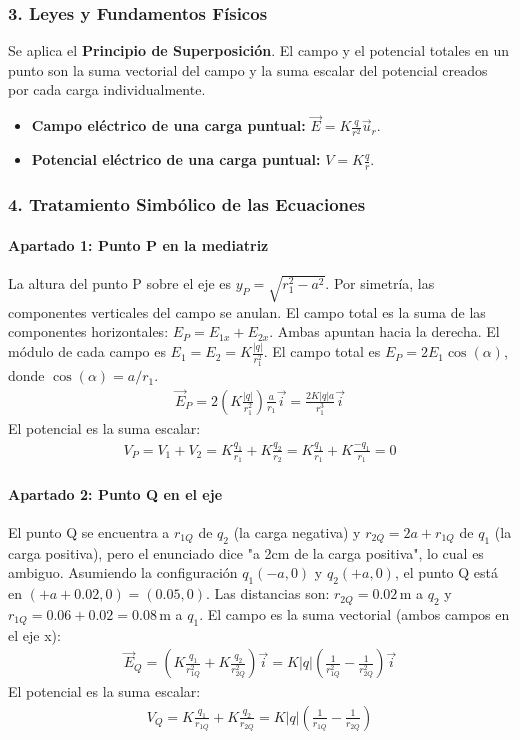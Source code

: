 \subsubsection*{3. Leyes y Fundamentos Físicos}
Se aplica el \textbf{Principio de Superposición}. El campo y el potencial totales en un punto son la suma vectorial del campo y la suma escalar del potencial creados por cada carga individualmente.
\begin{itemize}
    \item \textbf{Campo eléctrico de una carga puntual:} $\vec{E} = K \frac{q}{r^2} \vec{u}_r$.
    \item \textbf{Potencial eléctrico de una carga puntual:} $V = K \frac{q}{r}$.
\end{itemize}

\subsubsection*{4. Tratamiento Simbólico de las Ecuaciones}
\paragraph{Apartado 1: Punto P en la mediatriz}
La altura del punto P sobre el eje es $y_P = \sqrt{r_1^2 - a^2}$. Por simetría, las componentes verticales del campo se anulan. El campo total es la suma de las componentes horizontales: $E_P = E_{1x} + E_{2x}$. Ambas apuntan hacia la derecha. El módulo de cada campo es $E_1 = E_2 = K \frac{|q|}{r_1^2}$. El campo total es $E_P = 2 E_1 \cos(\alpha)$, donde $\cos(\alpha) = a/r_1$.
\begin{gather}
    \vec{E}_P = 2 \left(K \frac{|q|}{r_1^2}\right) \frac{a}{r_1} \vec{i} = \frac{2K|q|a}{r_1^3} \vec{i}
\end{gather}
El potencial es la suma escalar:
\begin{gather}
    V_P = V_1 + V_2 = K\frac{q_1}{r_1} + K\frac{q_2}{r_2} = K\frac{q_1}{r_1} + K\frac{-q_1}{r_1} = 0
\end{gather}

\paragraph{Apartado 2: Punto Q en el eje}
El punto Q se encuentra a $r_{1Q}$ de $q_2$ (la carga negativa) y $r_{2Q} = 2a+r_{1Q}$ de $q_1$ (la carga positiva), pero el enunciado dice "a 2cm de la carga positiva", lo cual es ambiguo. Asumiendo la configuración $q_1(-a,0)$ y $q_2(+a,0)$, el punto Q está en $(+a+0.02, 0) = (0.05, 0)$.
Las distancias son: $r_{2Q}=0.02\,\text{m}$ a $q_2$ y $r_{1Q}=0.06+0.02=0.08\,\text{m}$ a $q_1$.
El campo es la suma vectorial (ambos campos en el eje x):
\begin{gather}
    \vec{E}_Q = \left( K \frac{q_1}{r_{1Q}^2} + K \frac{q_2}{r_{2Q}^2} \right) \vec{i} = K|q| \left( \frac{1}{r_{1Q}^2} - \frac{1}{r_{2Q}^2} \right) \vec{i}
\end{gather}
El potencial es la suma escalar:
\begin{gather}
    V_Q = K\frac{q_1}{r_{1Q}} + K\frac{q_2}{r_{2Q}} = K|q| \left( \frac{1}{r_{1Q}} - \frac{1}{r_{2Q}} \right)
\end{gather}

